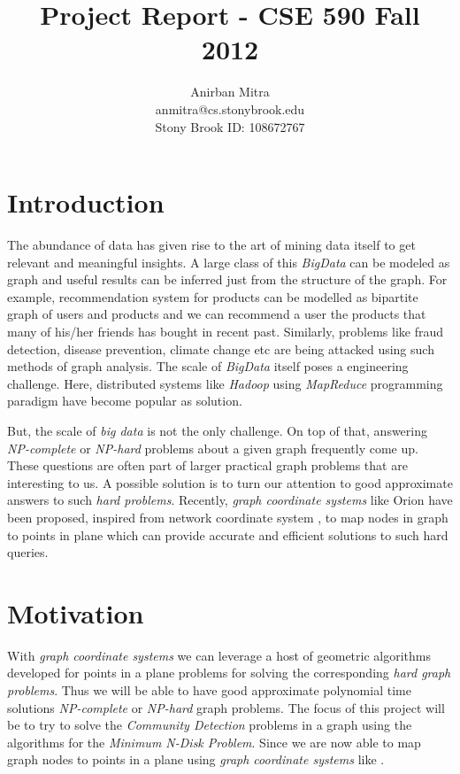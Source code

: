 \documentclass{article}
\title{Project Report - CSE 590 Fall 2012}
\author{Anirban Mitra\\
anmitra@cs.stonybrook.edu\\
Stony Brook ID: 108672767}
\begin{document}
    \maketitle
    \section{Introduction}
        The abundance of data has given rise to the art of mining data itself to get relevant and meaningful insights. A large class of this {\em BigData} can be modeled as graph and useful results can be inferred just from the structure of the graph. For example, recommendation system for products can be modelled as bipartite graph of users and products and we can recommend a user the products that many of his/her friends has bought in recent past. Similarly, problems like fraud detection, disease prevention, climate change etc are being attacked using such methods of graph analysis. The scale of {\em BigData} itself poses a engineering challenge. Here, distributed systems like {\em Hadoop} using {\em MapReduce} programming paradigm have become popular as solution.
        
        But, the scale of {\em big data} is not the only challenge. On top of that, answering {\em NP-complete} or {\em NP-hard} problems about a given graph frequently come up. These questions are often part of larger practical graph problems that are interesting to us. A possible solution is to turn our attention to good approximate answers to such {\em hard problems}. Recently, {\em graph coordinate systems} like Orion \cite{Orion} have been proposed, inspired from network coordinate system \cite{Vivaldi}, to map nodes in graph to points in plane which can provide accurate and efficient solutions to such hard queries.
        
    \section{Motivation}
    
        With {\em graph coordinate systems} we can leverage a host of geometric algorithms developed for points in a plane problems for solving the corresponding {\em hard graph problems}. Thus we will be able to have good approximate polynomial time solutions {\em NP-complete} or {\em NP-hard} graph problems. The focus of this project will be to try to solve the {\em Community Detection} problems in a graph using the algorithms for the {\em Minimum N-Disk Problem}. Since we are now able to map graph nodes to points in a plane using {\em graph coordinate systems} like \cite{Vivaldi}.
        
\end{document}
